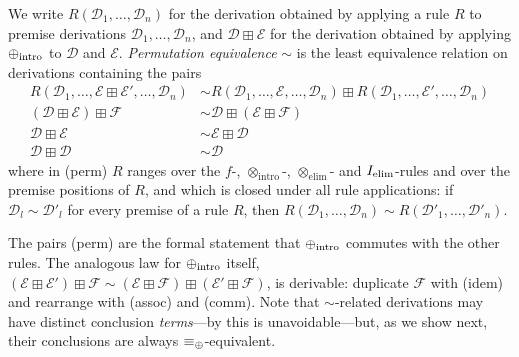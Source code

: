 \begin{definition}
\label{def:perm_equiv}
We write $R(\mathcal{D}_1, \ldots, \mathcal{D}_n)$ for the derivation obtained by applying a rule $R$ to premise derivations $\mathcal{D}_1, \ldots, \mathcal{D}_n$, and $\mathcal{D} \boxplus \mathcal{E}$ for the derivation obtained by applying $\mathbin{\oplus}_{\text{intro}}$ to $\mathcal{D}$ and $\mathcal{E}$.
\emph{Permutation equivalence} $\sim$ is the least equivalence relation on derivations containing the pairs
\begin{align}
  R(\mathcal{D}_1, \ldots, \mathcal{E} \boxplus \mathcal{E}', \ldots, \mathcal{D}_n) &\sim R(\mathcal{D}_1, \ldots, \mathcal{E}, \ldots, \mathcal{D}_n) \boxplus R(\mathcal{D}_1, \ldots, \mathcal{E}', \ldots, \mathcal{D}_n) \tag{perm}\\
  (\mathcal{D} \boxplus \mathcal{E}) \boxplus \mathcal{F} &\sim \mathcal{D} \boxplus (\mathcal{E} \boxplus \mathcal{F}) \tag{assoc}\\
  \mathcal{D} \boxplus \mathcal{E} &\sim \mathcal{E} \boxplus \mathcal{D} \tag{comm}\\
  \mathcal{D} \boxplus \mathcal{D} &\sim \mathcal{D} \tag{idem}
\end{align}
where in (perm) $R$ ranges over the $f$-, $\otimes_{\text{intro}}$-, $\otimes_{\text{elim}}$- and $I_{\text{elim}}$-rules and over the premise positions of $R$, and which is closed under all rule applications: if $\mathcal{D}_l \sim \mathcal{D}'_l$ for every premise of a rule $R$, then $R(\mathcal{D}_1, \ldots, \mathcal{D}_n) \sim R(\mathcal{D}'_1, \ldots, \mathcal{D}'_n)$.
\end{definition}

The pairs (perm) are the formal statement that $\mathbin{\oplus}_{\text{intro}}$ commutes with the other rules.
The analogous law for $\mathbin{\oplus}_{\text{intro}}$ itself, $(\mathcal{E} \boxplus \mathcal{E}') \boxplus \mathcal{F} \sim (\mathcal{E} \boxplus \mathcal{F}) \boxplus (\mathcal{E}' \boxplus \mathcal{F})$, is derivable: duplicate $\mathcal{F}$ with (idem) and rearrange with (assoc) and (comm).
Note that $\sim$-related derivations may have distinct conclusion \emph{terms}---by  this is unavoidable---but, as we show next, their conclusions are always $\equiv_{\mathbin{\oplus}}$-equivalent.

